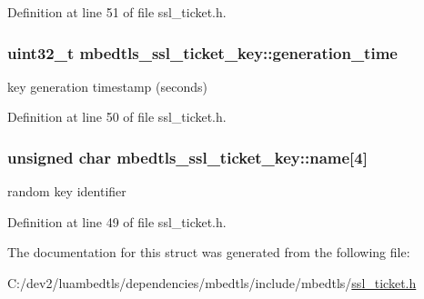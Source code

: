 Definition at line 51 of file ssl\-\_\-ticket.\-h.

\hypertarget{structmbedtls__ssl__ticket__key_ada9d97d06d4c215e4810880427ca50ad}{
\subsubsection[{generation\-\_\-time}]{\setlength{\rightskip}{0pt plus 5cm}uint32\-\_\-t mbedtls\-\_\-ssl\-\_\-ticket\-\_\-key\-::generation\-\_\-time}}\label{structmbedtls__ssl__ticket__key_ada9d97d06d4c215e4810880427ca50ad}
key generation timestamp (seconds) 

Definition at line 50 of file ssl\-\_\-ticket.\-h.

\hypertarget{structmbedtls__ssl__ticket__key_a5c80ec11a07ab4e19e775f7586a11d21}{
\subsubsection[{name}]{\setlength{\rightskip}{0pt plus 5cm}unsigned char mbedtls\-\_\-ssl\-\_\-ticket\-\_\-key\-::name\mbox{[}4\mbox{]}}}\label{structmbedtls__ssl__ticket__key_a5c80ec11a07ab4e19e775f7586a11d21}
random key identifier 

Definition at line 49 of file ssl\-\_\-ticket.\-h.



The documentation for this struct was generated from the following file\-:\begin{DoxyCompactItemize}
\item 
C\-:/dev2/luambedtls/dependencies/mbedtls/include/mbedtls/\hyperlink{ssl__ticket_8h}{ssl\-\_\-ticket.\-h}\end{DoxyCompactItemize}
